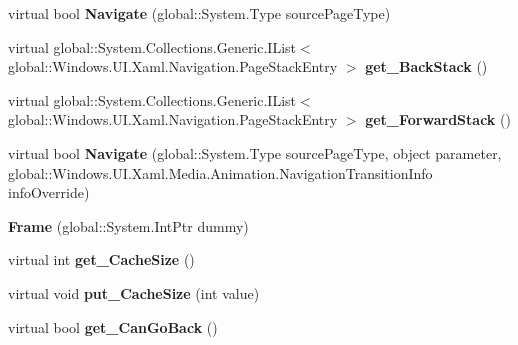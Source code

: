 \begin{DoxyCompactItemize}
virtual bool {\bfseries Navigate} (global\+::\+System.\+Type source\+Page\+Type)
\item 
\mbox{\label{class_windows_1_1_u_i_1_1_xaml_1_1_controls_1_1_frame_a80ca191b072efed7111ea58c25416f2e}} 
virtual global\+::\+System.\+Collections.\+Generic.\+I\+List$<$ global\+::\+Windows.\+U\+I.\+Xaml.\+Navigation.\+Page\+Stack\+Entry $>$ {\bfseries get\+\_\+\+Back\+Stack} ()
\item 
\mbox{\label{class_windows_1_1_u_i_1_1_xaml_1_1_controls_1_1_frame_ae329d75ad7803db9b56a1087833db051}} 
virtual global\+::\+System.\+Collections.\+Generic.\+I\+List$<$ global\+::\+Windows.\+U\+I.\+Xaml.\+Navigation.\+Page\+Stack\+Entry $>$ {\bfseries get\+\_\+\+Forward\+Stack} ()
\item 
\mbox{\label{class_windows_1_1_u_i_1_1_xaml_1_1_controls_1_1_frame_ad618ba9d883d20cb4fe2b759803359e9}} 
virtual bool {\bfseries Navigate} (global\+::\+System.\+Type source\+Page\+Type, object parameter, global\+::\+Windows.\+U\+I.\+Xaml.\+Media.\+Animation.\+Navigation\+Transition\+Info info\+Override)
\item 
\mbox{\label{class_windows_1_1_u_i_1_1_xaml_1_1_controls_1_1_frame_a84fab9df3b200274d2539149011dfb10}} 
{\bfseries Frame} (global\+::\+System.\+Int\+Ptr dummy)
\item 
\mbox{\label{class_windows_1_1_u_i_1_1_xaml_1_1_controls_1_1_frame_a4feacaac243c53e320ffcf6ceba4a5e7}} 
virtual int {\bfseries get\+\_\+\+Cache\+Size} ()
\item 
\mbox{\label{class_windows_1_1_u_i_1_1_xaml_1_1_controls_1_1_frame_af1e1e012518d0402becbf9239646174d}} 
virtual void {\bfseries put\+\_\+\+Cache\+Size} (int value)
\item 
\mbox{\label{class_windows_1_1_u_i_1_1_xaml_1_1_controls_1_1_frame_ab2b52e19abf5dd97c35d8e4da92c57db}} 
virtual bool {\bfseries get\+\_\+\+Can\+Go\+Back} ()

\end{DoxyCompactItemize}
